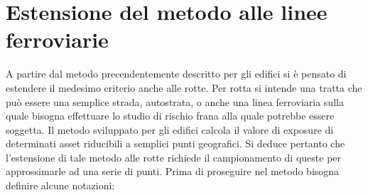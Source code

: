 
\chapter{Estensione del metodo alle linee ferroviarie}
\label{metodoLinee} %
A partire dal metodo precendentemente descritto per gli edifici si è pensato di estendere il medesimo criterio anche alle rotte. Per rotta si intende una tratta che può essere una semplice strada, autostrata, o anche una linea ferroviaria sulla quale bisogna effettuare lo studio di rischio frana alla quale potrebbe essere soggetta. Il metodo sviluppato per gli edifici calcola il valore di exposure di determinati asset riducibili a semplici punti geografici. Si deduce pertanto che l'estensione di tale metodo alle rotte richiede il campionamento di queste per approssimarle ad una serie di punti.
Prima di proseguire nel metodo bisogna definire alcune notazioni:

